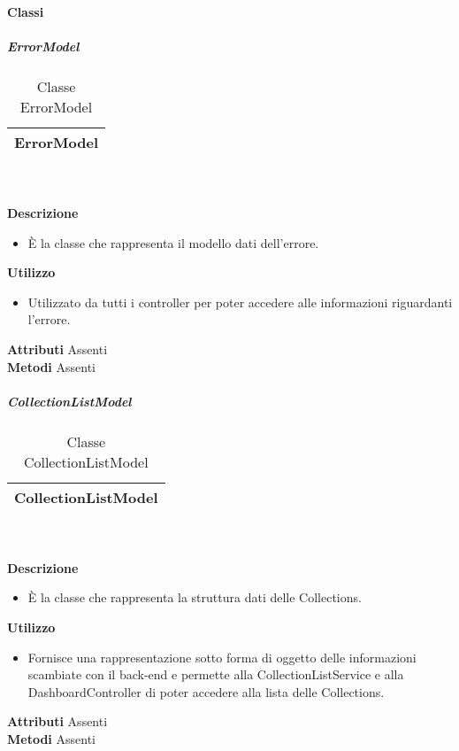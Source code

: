 		\paragraph{Classi}
			\subparagraph{ErrorModel} 
\begin{table}[ht]
\begin{center}
\bgroup
	\setlength{\arrayrulewidth}{0.6mm}
	\def\arraystretch{1}
		\begin{tabular}{ | p{12cm} | }
				\hline  
					\centerline{\textbf{ErrorModel}}
		\\ \hline 
				\hline
				\hline
		
		\end{tabular}
\egroup
\caption{Classe ErrorModel}
\end{center}
\end{table} \textbf{\\ \\ Descrizione}
\begin{itemize}
\item[] È la classe che rappresenta il modello dati dell'errore.
\end{itemize} 
\textbf{Utilizzo}
\begin{itemize}
\item[] Utilizzato da tutti i controller per poter accedere alle informazioni riguardanti l'errore.
\end{itemize}
\textbf{Attributi}
Assenti \\
\textbf{Metodi}
Assenti \\

			\subparagraph{CollectionListModel} 
\begin{table}[ht]
\begin{center}
\bgroup
	\setlength{\arrayrulewidth}{0.6mm}
	\def\arraystretch{1}
		\begin{tabular}{ | p{12cm} | }
				\hline  
					\centerline{\textbf{CollectionListModel}}
		\\ \hline 
				\hline
				\hline
		
		\end{tabular}
\egroup
\caption{Classe CollectionListModel}
\end{center}
\end{table} \textbf{\\ \\ Descrizione}
\begin{itemize}
\item[] È la classe che rappresenta la struttura dati delle Collections.
\end{itemize} 
\textbf{Utilizzo}
\begin{itemize}
\item[] Fornisce una rappresentazione sotto forma di oggetto delle informazioni scambiate con il back-end e permette alla CollectionListService e alla DashboardController di poter accedere alla lista delle Collections.
\end{itemize}
\textbf{Attributi}
Assenti \\
\textbf{Metodi}
Assenti \\

